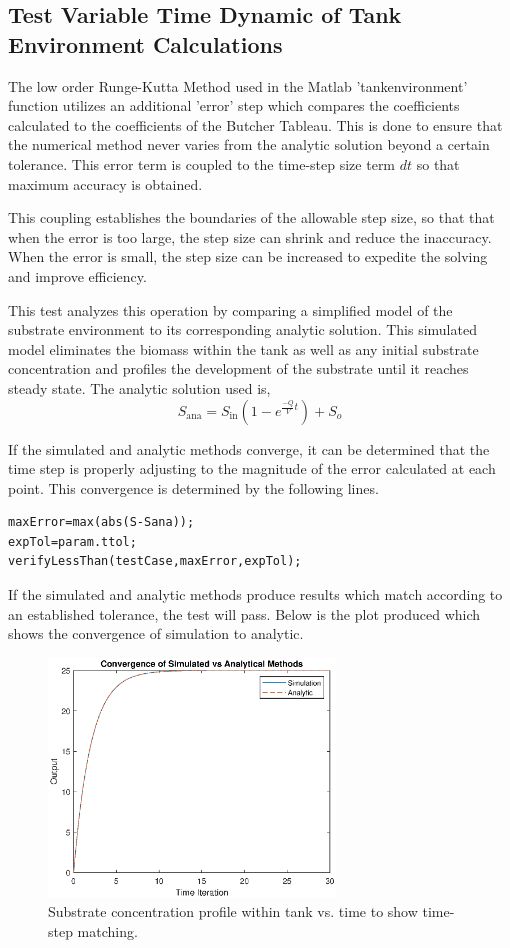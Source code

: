 \documentclass[letterpaper, twoside]{article}
\numberwithin{equation}{section}
\begin{document}
\subsection{Test Variable Time Dynamic of Tank Environment Calculations}
The low order Runge-Kutta Method used in the Matlab 'tankenvironment' function utilizes an additional 'error' step which compares the coefficients calculated to the coefficients of the Butcher Tableau. This is done to ensure that the numerical method never varies from the analytic solution beyond a certain tolerance. This error term is coupled to the time-step size term $dt$ so that maximum accuracy is obtained. 

This coupling establishes the boundaries of the allowable step size, so that that when the error is too large, the step size can shrink and reduce the inaccuracy. When the error is small, the step size can be increased to expedite the solving and improve efficiency. 

This test analyzes this operation by comparing a simplified model of the substrate environment to its corresponding analytic solution. This simulated model eliminates the biomass within the tank as well as any initial substrate concentration and profiles the development of the substrate until it reaches steady state. The analytic solution used is,
\begin{equation} \label{eq: S_ana}
  S_\mathrm{ana}=S_\mathrm{in}{(1-e^{\frac{-Q}{V}t})} + S_o
\end{equation}

If the simulated and analytic methods converge, it can be determined that the time step is properly adjusting to the magnitude of the error calculated at each point. This convergence is determined by the following lines.

\begin{lstlisting}
maxError=max(abs(S-Sana));
expTol=param.ttol;
verifyLessThan(testCase,maxError,expTol);
\end{lstlisting}

If the simulated and analytic methods produce results which match according to an established tolerance, the test will pass. Below is the plot produced which shows the convergence of simulation to analytic.

\begin{figure}[H]
  \centering
  \includegraphics[read=eps, width=3in]{TimeDynamics_Figure.eps}
  \caption{Substrate concentration profile within tank vs. time to show time-step matching.}
\end{figure}
\end{document}
